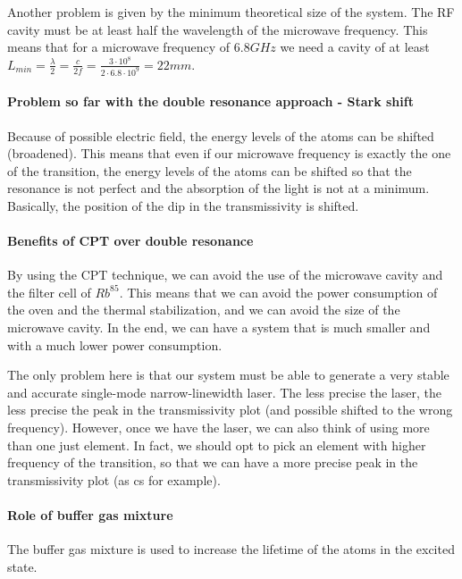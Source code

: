 Another problem is given by the minimum theoretical size of the system.
The RF cavity must be at least half the wavelength of the microwave frequency.
This means that for a microwave frequency of $6.8GHz$ we need a cavity of at least $L_{min} = \frac{\lambda}{2} = \frac{c}{2f} = \frac{3 \cdot 10^8}{2 \cdot 6.8 \cdot 10^9} = 22mm$.

\paragraph{Problem so far with the double resonance approach - Stark shift}

Because of possible electric field, the energy levels of the atoms can be shifted (broadened).
This means that even if our microwave frequency is exactly the one of the transition, the energy levels of the atoms can be shifted so that the resonance is not perfect and the absorption of the light is not at a minimum.
Basically, the position of the dip in the transmissivity is shifted.

\paragraph{Benefits of CPT over double resonance}

By using the CPT technique, we can avoid the use of the microwave cavity and the filter cell of $Rb^{85}$.
This means that we can avoid the power consumption of the oven and the thermal stabilization, and we can avoid the size of the microwave cavity.
In the end, we can have a system that is much smaller and with a much lower power consumption.

The only problem here is that our system must be able to generate a very stable and accurate single-mode narrow-linewidth laser.
The less precise the laser, the less precise the peak in the transmissivity plot (and possible shifted to the wrong frequency).
However, once we have the laser, we can also think of using more than one just element.
In fact, we should opt to pick an element with higher frequency of the transition, so that we can have a more precise peak in the transmissivity plot (as \acrfull{cs} for example).

\paragraph{Role of buffer gas mixture}

The buffer gas mixture is used to increase the lifetime of the atoms in the excited state.